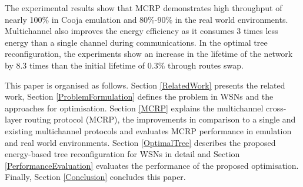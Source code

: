 The experimental results show that MCRP demonstrates high throughput of nearly 100\% 
in Cooja emulation and 80\%-90\% in the real world environments. Multichannel also improves the energy efficiency as it consumes 3 times less energy than a single channel during communications.
In the optimal tree reconfiguration, the experiments show an increase in the lifetime of the network by 8.3 times than the initial lifetime of 0.3\% through routes swap.


This paper is organised as follows. Section \ref{RelatedWork} presents the related work, Section \ref{ProblemFormulation} defines the problem in WSNs and the approaches for optimisation. Section \ref{MCRP} explains the multichannel cross-layer routing protocol (MCRP), the improvements in comparison to a single and existing multichannel protocols and evaluates MCRP performance in emulation and real world environments.
Section \ref{OptimalTree} describes the proposed energy-based tree reconfiguration for WSNs in detail and Section \ref{PerformanceEvaluation} evaluates the performance of the proposed optimisation. Finally, Section \ref{Conclusion} concludes this paper.
